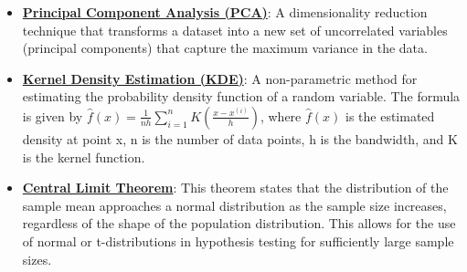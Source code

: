 \documentclass{article}%
\begin{document}
\begin{itemize}[leftmargin=*]%
\item \href{https://purdue.brightspace.com/d2l/common/assets/pdfjs-d2l-dist/1.0.14-legacy/web/viewer.html?file=\%2Fcontent\%2Fenforced\%2F1095465-WL.202510.CS24200.LE1\%2F10L2-Vis.pdf\%3Fou\%3D1095465\&lang=en-us\&container=d2l-fileviewer-rendered-pdf\&fullscreen=d2l-fileviewer-rendered-pdf-dialog\&height=667#page=4}{\textbf{Principal Component Analysis (PCA)}}: A dimensionality reduction technique that transforms a dataset into a new set of uncorrelated variables (principal components) that capture the maximum variance in the data.%
\item \href{https://purdue.brightspace.com/d2l/common/assets/pdfjs-d2l-dist/1.0.14-legacy/web/viewer.html?file=\%2Fcontent\%2Fenforced\%2F1095465-WL.202510.CS24200.LE1\%2F10L2-Vis.pdf\%3Fou\%3D1095465\&lang=en-us\&container=d2l-fileviewer-rendered-pdf\&fullscreen=d2l-fileviewer-rendered-pdf-dialog\&height=667#page=32}{\textbf{Kernel Density Estimation (KDE)}}: A non-parametric method for estimating the probability density function of a random variable. The formula is given by $\hat{f}(x) = \frac{1}{nh} \sum_{i=1}^n K\left(\frac{x - x^{(i)}}{h}\right)$, where $\hat{f}(x)$ is the estimated density at point x, n is the number of data points, h is the bandwidth, and K is the kernel function.%
\end{itemize}%
\begin{itemize}[leftmargin=*]%
\item \href{https://purdue.brightspace.com/d2l/common/assets/pdfjs-d2l-dist/1.0.14-legacy/web/viewer.html?file=\%2Fcontent\%2Fenforced\%2F1095465-WL.202510.CS24200.LE1\%2F13L2-hypothesis.pdf\%3Fou\%3D1095465\&lang=en-us\&container=d2l-fileviewer-rendered-pdf\&fullscreen=d2l-fileviewer-rendered-pdf-dialog\&height=667#page=18}{\textbf{Central Limit Theorem}}: This theorem states that the distribution of the sample mean approaches a normal distribution as the sample size increases, regardless of the shape of the population distribution. This allows for the use of normal or t-distributions in hypothesis testing for sufficiently large sample sizes.%
\end{itemize}%
\end{document}
